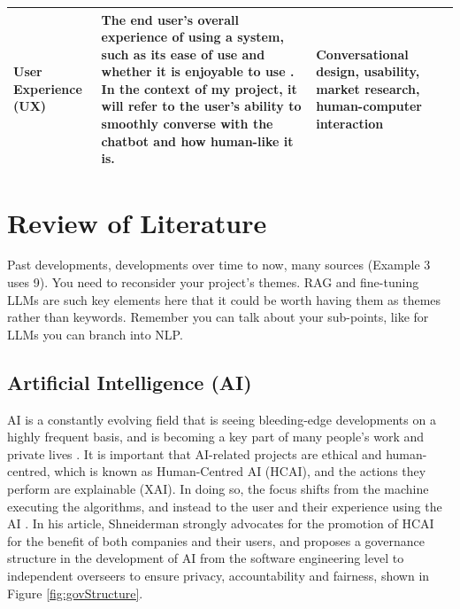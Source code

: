 \documentclass[12pt]{report}
\begin{document}
\begin{table}[H]
\begin{tabular}{|p{}|p{} | p{}|}
            \hline

            User Experience (UX) & The end user's overall experience of using a system, such as its ease of use and 
            whether it is enjoyable to use \autocite{UXDict}. In the context of my project, it will refer to the user's 
            ability to smoothly converse with the chatbot and how human-like it is. 
            & Conversational design, usability, market research, human-computer interaction

            \\

            \hline 

        \end{tabular}\label{tab:themes}
    \end{table}


    \pagebreak %

    \section{Review of Literature}

    \begin{tcolorbox}[colback=red!5!white,colframe=red!75!black,title=To-do for each theme]
        Past developments, developments over time to now, many sources (Example 3 uses 9).
        You need to reconsider your project's themes. RAG and fine-tuning LLMs are such key elements 
        here that it could be worth having them as themes rather than keywords.
        Remember you can talk about your sub-points, like for LLMs you can branch into NLP.
    \end{tcolorbox}

    \subsection{Artificial Intelligence (AI)}

    AI is a constantly evolving field that is seeing bleeding-edge developments on a 
    highly frequent basis, and is becoming a key part of many people's work and private lives \autocite{AIDigitalAssistants}. 
    It is important that AI-related projects are ethical and 
    human-centred, which is known as Human-Centred AI (HCAI), and the actions they perform 
    are explainable (XAI). In doing so, the focus 
    shifts from the machine executing the algorithms, and instead to the user and their experience 
    using the AI \autocite{AIEthics}. In his article, Shneiderman strongly advocates for the 
    promotion of HCAI for the benefit of both companies and their users, and proposes a governance 
    structure in the development of AI from the software engineering level to independent overseers 
    to ensure privacy, accountability and fairness, shown in Figure \ref{fig:govStructure}. 
\end{document}
